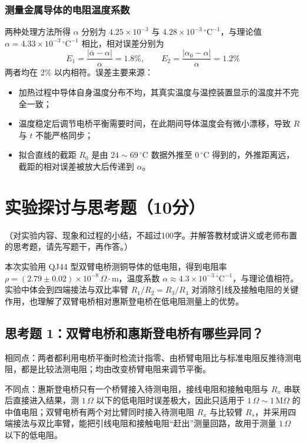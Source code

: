 \documentclass{Phyport}
\begin{document}
\subsubsection{测量金属导体的电阻温度系数}

两种处理方法所得 $\alpha$ 分别为 $4.25\times10^{-3}$ 与 $4.28\times10^{-3}\,^\circ\mathrm{C}^{-1}$，与理论值 $\alpha=4.33\times10^{-3}\,^\circ\mathrm{C}^{-1}$ 相比，相对误差分别为
\begin{equation*}
    E_1=\frac{|\bar{\alpha}-\alpha|}{\alpha}=1.8\%,\qquad
    E_2=\frac{|\alpha_0-\alpha|}{\alpha}=1.2\%
\end{equation*}
两者均在 2\% 以内相符。误差主要来源：

\begin{itemize}
    \item 加热过程中导体自身温度分布不均，其真实温度与温控装置显示的温度并不完全一致；
    \item 温度稳定后调节电桥平衡需要时间，在此期间导体温度会有微小漂移，导致 $R$ 与 $t$ 不能严格同步；
    \item 拟合直线的截距 $R_0$ 是由 $24\sim69\,^\circ\mathrm{C}$ 数据外推至 $0\,^\circ\mathrm{C}$ 得到的，外推距离远，截距的相对误差被放大后传递到 $\alpha$。
\end{itemize}

\section{实验探讨与思考题（10分）}
（对实验内容、现象和过程的小结，不超过100字。并解答教材或讲义或老师布置的思考题，请先写题干，再作答。）

本次实验用 QJ44 型双臂电桥测铜导体的低电阻，得到电阻率 $\rho=(2.79\pm0.02)\times10^{-8}\,\Omega\cdot\mathrm{m}$，温度系数 $\alpha\approx4.3\times10^{-3}\,^\circ\mathrm{C}^{-1}$，与理论值相符。实验中体会到四端接法与双比率臂 $R_1/R_2=R_3/R_4$ 对消除引线及接触电阻的关键作用，也理解了双臂电桥相对惠斯登电桥在低电阻测量上的优势。

\subsection*{思考题 1：双臂电桥和惠斯登电桥有哪些异同？}

相同点：两者都利用电桥平衡时检流计指零、由桥臂电阻比与标准电阻反推待测电阻，都是比较法测电阻；均由改变桥臂电阻来调节平衡。

不同点：惠斯登电桥只有一个桥臂接入待测电阻，接线电阻和接触电阻与 $R_x$ 串联后直接进入结果，测 $1\,\Omega$ 以下的低电阻时误差极大，因此只适用于 $1\,\Omega\sim1\,\mathrm{M}\Omega$ 的中值电阻；双臂电桥有两个对比臂同时接入待测电阻 $R_x$ 与比较臂 $R_s$，并采用四端接法与双比率臂，能把引线电阻和接触电阻“赶出”测量回路，故用于测量 $1\,\Omega$ 以下的低电阻。
\end{document}
